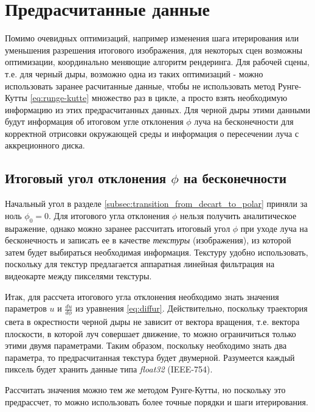 \section{Предрасчитанные данные}
\label{sec:Chapter2} 

Помимо очевидных оптимизаций, например изменения шага итерирования или уменьшения разрешения итогового изображения, для некоторых сцен возможны оптимизации, координально меняющие алгоритм рендеринга. Для рабочей сцены, т.е. для черный дыры, возможно одна из таких оптимизаций - можно использовать заранее расчитанные данные, чтобы не использовать метод Рунге-Кутты \eqref{eq:runge-kutte} множество раз в цикле, а просто взять необходимую информацию из этих предрасчитанных данных. Для черной дыры этими данными будут информация об итоговом угле отклонения $\phi$ луча на бесконечности для корректной отрисовки окружающей среды и информация о пересечении луча с аккреционного диска.

\subsection{Итоговый угол отклонения $\phi$ на бесконечности}
\label{subsec:precomputed_phi}

Начальный угол в разделе \ref{subsec:transition_from_decart_to_polar} приняли за ноль $\phi_{0} = 0$. Для итогового угла отклонения $\phi$ нельзя получить аналитическое выражение, однако можно заранее рассчитать итоговый угол $\phi$ при уходе луча на бесконечность и записать ее в качестве \textit{текстуры} (изображения), из которой затем будет выбираться необходимая информация. Текстуру удобно использовать, поскольку для текстур предлагается аппаратная линейная фильтрация на видеокарте между пикселями текстуры.

Итак, для рассчета итогового угла отклонения необходимо знать значения параметров $u$ и $\frac{du}{d\phi}$ из уравнения \eqref{eq:diffur}. Действительно, поскольку траектория света в окрестности черной дыры не зависит от вектора вращения, т.е. вектора плоскости, в которой луч совершает движение, то можно ограничиться только этими двумя параметрами. Таким образом, поскольку необходимо знать два параметра, то предрасчитанная текстура будет двумерной. Разумеется каждый пиксель будет хранить данные типа \textit{float32} (IEEE-754).

Рассчитать значения можно тем же методом Рунге-Кутты, но поскольку это предрассчет, то можно использовать более точные порядки и шаги итерирования.

